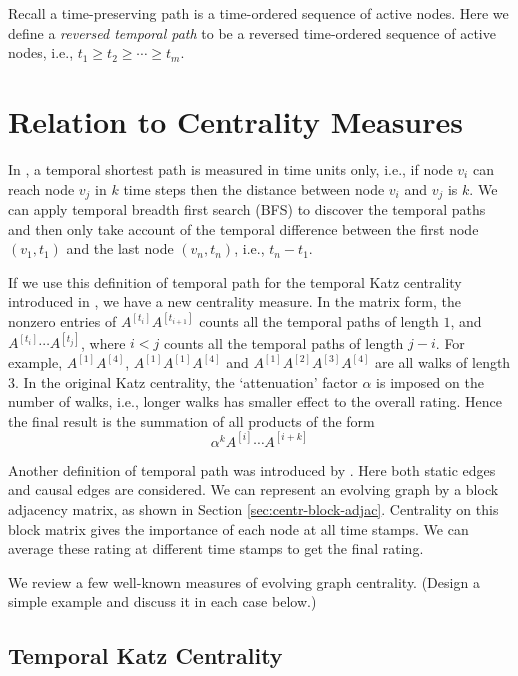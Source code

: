 \documentclass[12pt]{article}
\theoremstyle{definition}
\begin{document}
Recall a time-preserving path is a time-ordered sequence of active nodes. Here we define a \emph{reversed temporal path} to be a reversed time-ordered sequence of active nodes, i.e.,
$t_1 \ge t_2 \ge \cdots \ge t_m$.


\section{Relation to Centrality Measures}
\label{sec:topol-temp-flow}

In \cite{tang10s}, a temporal shortest path is measured in time units only, i.e., if node
$v_i$ can reach node $v_j$ in $k$ time steps then the distance between node
$v_i$ and $v_j$ is $k$. We can apply temporal breadth first
search (BFS) \cite{chen16} to discover the temporal paths and then only take account of the temporal difference between the first node $(v_1, t_1)$ and the last node $(v_n, t_n)$, i.e., $t_n - t_1$.

If we use this definition of temporal path for the temporal Katz centrality introduced in
\cite{grindrod11}, we have a new centrality measure.
In the matrix form, the nonzero entries of $A^{[t_i]} A^{[t_{i+1}]}$ counts all the temporal paths of length $1$, and
$A^{[t_i]}\cdots A^{[t_j]}$, where $i < j$ counts all the temporal paths of length $j -i$.
For example, $A^{[1]}A^{[4]}$, $A^{[1]}A^{[1]}A^{[4]}$ and $A^{[1]}A^{[2]}A^{[3]}A^{[4]}$ are all walks of length 3.
In the original Katz centrality, the `attenuation' factor $\alpha$ is imposed on the
number of walks, i.e., longer walks has smaller effect to the overall rating.
Hence the final result is the summation of all products of the form
\[
\alpha^k A^{[i]} \cdots A^{[i+k]}
\]


Another definition of temporal path was introduced by \cite{chen16}. Here
both static edges and causal edges are considered. We can represent an evolving graph by a block adjacency matrix, as shown in Section \ref{sec:centr-block-adjac}. Centrality on this block matrix gives the importance of each node at all time stamps. We can average these rating at different time stamps to
get the final rating.


We review a few well-known measures of evolving graph centrality.
(Design a simple example and discuss it in each case below.)
\subsection{Temporal Katz Centrality}
\label{sec:temp-katz-centr}
\end{document}
